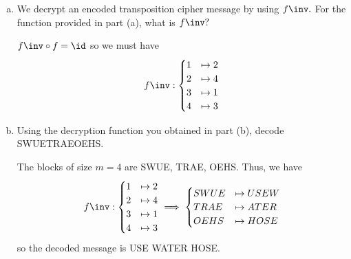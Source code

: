 \documentclass{article}
\begin{document}
\begin{itemize}
\begin{enumerate}[(a)]
			\item We decrypt an encoded transposition cipher message by using $f\inv.$ For the function provided in part (a), what is $f\inv?$
				\begin{soln}
					$f\inv \circ f =\id$ so we must have
					\begin{align*}
						f\inv:\begin{cases}
							1&\mapsto 2 \\
							2 &\mapsto 4 \\
							3 &\mapsto 1 \\
							4 &\mapsto 3
						\end{cases}
					\end{align*}
				\end{soln}

			\item Using the decryption function you obtained in part (b), decode SWUETRAEOEHS.
				\begin{soln}
					The blocks of size $m=4$ are SWUE, TRAE, OEHS. Thus, we have
					\begin{align*}
						f\inv:\begin{cases}
							1&\mapsto 2 \\
							2 &\mapsto 4 \\
							3 &\mapsto 1 \\
							4 &\mapsto 3
						\end{cases} \implies \begin{cases}
							SWUE &\mapsto USEW \\
							TRAE &\mapsto ATER \\
							OEHS &\mapsto HOSE
						\end{cases}
					\end{align*}
					so the decoded message is USE WATER HOSE.
				\end{soln}
				
		\end{enumerate}


\end{itemize}
\end{document}
